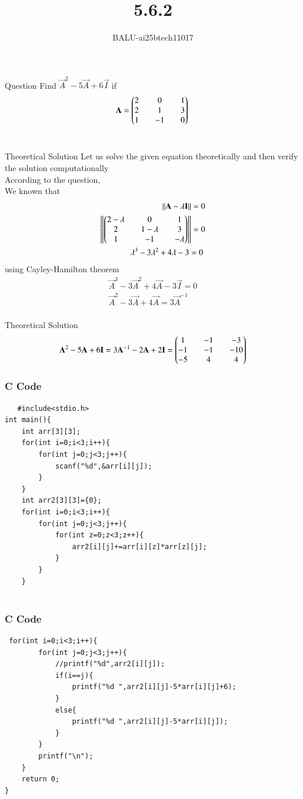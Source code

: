 \documentclass{beamer}
\title %
{5.6.2}
\author %
{BALU-ai25btech11017}
\begin{document}
\frame{\titlepage}
\begin{frame}{Question}
Find $\vec{A}^2-5\vec{A}+6\vec{I}$ if 
\begin{align}
    \mathbf{A}=\begin{pmatrix}2&&0&&1\\2&&1&&3\\1&&-1&&0\end{pmatrix}\
\end{align}\\ 
\end{frame}
\begin{frame}{Theoretical Solution}
Let us solve the given equation theoretically and then verify the solution computationally \\
According to the question, \\
We known that\\
\begin{align}
    \|\mathbf{A}-\lambda\mathbf{I}\|=0\\
    \left\|\begin{pmatrix}2-\lambda&&0&&1\\2&&1-\lambda&&3\\1&&-1&&-\lambda\end{pmatrix}\right\|=0\\
    \lambda^3-3\lambda^2+4\lambda-3=0\
\end{align}
using Cayley-Hamilton theorem
\begin{align}
    \vec{A}^3-3\vec{A}^2+4\vec{A}-3\vec{I}=0\\
    \vec{A}^2-3\vec{A}+4\vec{A}=3\vec{A}^{-1}\\
    \end{align}
\end{frame}
\begin{frame}{Theoretical Solution}
\begin{align}
    \mathbf{A}^2-5\mathbf{A}+6\mathbf{I}=3\mathbf{A}^{-1}-2\mathbf{A}+2\mathbf{I}=\begin{pmatrix}1&&-1&&-3\\-1&&-1&&-10\\-5&&4&&4\end{pmatrix}
\end{align}
\end{frame}
\begin{frame}[fragile]
    \frametitle{C Code}

    \begin{lstlisting}
   #include<stdio.h>
int main(){
    int arr[3][3];
    for(int i=0;i<3;i++){
        for(int j=0;j<3;j++){
            scanf("%d",&arr[i][j]);
        }
    }
    int arr2[3][3]={0};
    for(int i=0;i<3;i++){
        for(int j=0;j<3;j++){
            for(int z=0;z<3;z++){
                arr2[i][j]+=arr[i][z]*arr[z][j];
            }
        }
    }
   
    \end{lstlisting}
\end{frame}
\begin{frame}[fragile]
    \frametitle{C Code }
    \begin{lstlisting}
 for(int i=0;i<3;i++){
        for(int j=0;j<3;j++){
            //printf("%d",arr2[i][j]);
            if(i==j){
                printf("%d ",arr2[i][j]-5*arr[i][j]+6);
            }
            else{
                printf("%d ",arr2[i][j]-5*arr[i][j]);
            }
        }
        printf("\n");
    }
    return 0;
}
    \end{lstlisting}
\end{frame}
\end{document}
